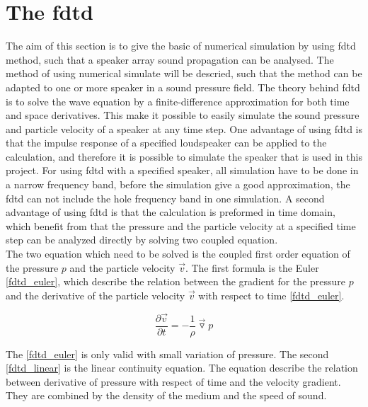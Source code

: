 \section{The \gls{fdtd}}
The aim of this section is to give the basic of numerical simulation by using \gls{fdtd} method, such that a speaker array sound propagation can be analysed. The method of using numerical simulate will be descried, such that the method can be adapted to one or more speaker in a sound pressure field. 
The theory behind \gls{fdtd} is to solve the wave equation by a finite-difference approximation for both time and space derivatives. This make it possible to easily simulate the sound pressure and particle velocity of a speaker at any time step. One advantage of using \gls{fdtd} is that the impulse response of a specified loudspeaker can be applied to the calculation, and therefore it is possible to simulate the speaker that is used in this project. For using \gls{fdtd} with a specified speaker, all simulation have to be done in a narrow frequency band, before the simulation give a good approximation, the \gls{fdtd} can not include the hole frequency band in one simulation. A second advantage of using \gls{fdtd} is that the calculation is preformed in time domain, which benefit from that the pressure and the particle velocity at a specified time step can be analyzed directly by solving two coupled equation.\citep{fdtddaga}\\


The two equation which need to be solved is the coupled first order equation of the pressure $p$ and the particle velocity $\vec{v}$. The first formula is the Euler \autoref{fdtd_euler}, which describe the relation between the gradient for the pressure $p$ and the derivative of the particle velocity $\vec{v}$ with respect to time \autoref{fdtd_euler}. 

\begin{equation}\label{fdtd_euler}
\frac{\partial \vec{v}}{\partial t} =- \frac{1}{\rho}\vec{\triangledown }p
\end{equation}

    \startexplain
    \stopexplain

The \autoref{fdtd_euler} is only valid with small variation of pressure. The second \autoref{fdtd_linear} is the linear continuity equation. The equation describe the relation between derivative of pressure with respect of time and the velocity gradient. They are combined by the density of the medium and the speed of sound. 

